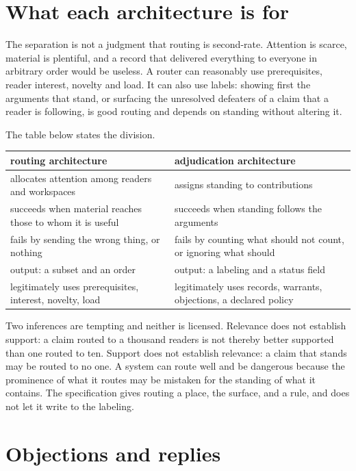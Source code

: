 \documentclass[11pt]{article}
\begin{document}
\section{What each architecture is for}\label{sec:for}

The separation is not a judgment that routing is second-rate. Attention is scarce, material is plentiful, and a record that delivered everything to everyone in arbitrary order would be useless. A router can reasonably use prerequisites, reader interest, novelty and load. It can also use labels: showing first the arguments that stand, or surfacing the unresolved defeaters of a claim that a reader is following, is good routing and depends on standing without altering it.

The table below states the division.

\begin{center}
\small
\begin{tabularx}{\textwidth}{@{}X X@{}}
\toprule
routing architecture & adjudication architecture\\
\midrule
allocates attention among readers and workspaces & assigns standing to contributions\\
succeeds when material reaches those to whom it is useful & succeeds when standing follows the arguments\\
fails by sending the wrong thing, or nothing & fails by counting what should not count, or ignoring what should\\
output: a subset and an order & output: a labeling and a status field\\
legitimately uses prerequisites, interest, novelty, load & legitimately uses records, warrants, objections, a declared policy\\
\bottomrule
\end{tabularx}
\end{center}

Two inferences are tempting and neither is licensed. Relevance does not establish support: a claim routed to a thousand readers is not thereby better supported than one routed to ten. Support does not establish relevance: a claim that stands may be routed to no one. A system can route well and be dangerous because the prominence of what it routes may be mistaken for the standing of what it contains. The specification gives routing a place, the surface, and a rule, and does not let it write to the labeling.

\section{Objections and replies}\label{sec:objections}
\end{document}
